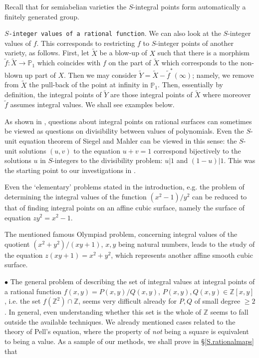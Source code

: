 \documentclass[leqno,12pt]{article} %
\def\Z{{{\mathbb Z}}}
\def\P{{{\mathbb P}}}
\theoremstyle{plain} %
\theoremstyle{definition} %
\begin{document}
Recall that for semiabelian varieties   the $S$-integral points form  automatically a finitely generated group. 

\medskip

{\tt $S$-integer values of a rational function}. We can also look at the $S$-integer values of $f$. This corresponds to restricting $f$ to $S$-integer points of another variety, as follows. First, let $\tilde X$ be a blow-up of $X$ such that there is a morphism  $\tilde f:\tilde X\to\P_1$ which coincides with $f$ on the  part of $\tilde X$ which corresponds to the non-blown up part of $X$. Then we may consider $\tilde Y=\tilde X-\tilde f^*(\infty)$; namely, we remove from $\tilde X$ the pull-back of the point at infinity in $\P_1$. Then, essentially by definition, the  integral points of $\tilde Y$ are those integral points of $\tilde X$ where moreover $\tilde f$ assumes integral values. We shall see examples below.


\smallskip

 As shown in \cite{CZadv}, questions about integral points on rational surfaces  can sometimes be viewed as questions on divisibility between values of polynomials. Even the $S$-unit equation theorem of Siegel and Mahler can be viewed in this sense: the $S$-unit solutions $(u,v)$ to the equation $u+v=1$ correspond bijectively to the solutions $u$ in $S$-integers to the divisibility problem: $u|1$ and $(1-u)|1$. This was the starting point to our investigations in \cite{CZadv}.
 
 Even the `elementary' problems stated in the introduction, e.g. the problem of determining the integral values of the function $(x^2-1)/y^2$ can be reduced to that of finding integral points on an affine cubic surface, namely the surface of equation $zy^2=x^2-1$.
 
 
The mentioned famous Olympiad problem, concerning integral values of the quotient $(x^2+y^2)/(xy+1)$, $x,y$ being natural numbers, leads to the study of the   equation $z(xy+1)=x^2+y^2$, which represents another affine smooth cubic surface. 

\smallskip

$\bullet$ The general problem of describing  the  set of integral values at integral points of a rational function  $f(x,y)=P(x,y)/Q(x,y)$, $P(x,y), Q(x,y)\in\Z[x,y]$, i.e. the set $f(\Z^2)\cap \Z$, seems very difficult already for $P,Q$ of small degree $\geq 2$. In general, even understanding   whether this set is the whole of $\Z$ seems to fall outside the available techniques. We already mentioned cases related to the theory of Pell's equation, where the property of {\it not} being a square is equivalent to being a value. As a sample of our methods, we shall prove in  \S \ref{S.rationalmaps}  that
\medskip
\end{document}
